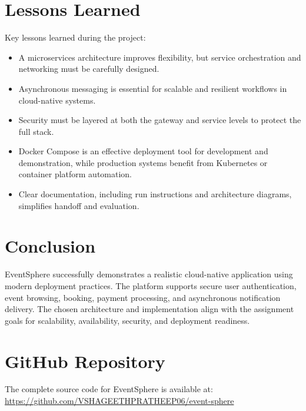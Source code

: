 \documentclass[12pt,a4paper]{article}
\begin{document}
\section{Lessons Learned}
Key lessons learned during the project:
\begin{itemize}[itemsep=0.4em]
    \item A microservices architecture improves flexibility, but service orchestration and networking must be carefully designed.
    \item Asynchronous messaging is essential for scalable and resilient workflows in cloud-native systems.
    \item Security must be layered at both the gateway and service levels to protect the full stack.
    \item Docker Compose is an effective deployment tool for development and demonstration, while production systems benefit from Kubernetes or container platform automation.
    \item Clear documentation, including run instructions and architecture diagrams, simplifies handoff and evaluation.
\end{itemize}

\section{Conclusion}
EventSphere successfully demonstrates a realistic cloud-native application using modern deployment practices. The platform supports secure user authentication, event browsing, booking, payment processing, and asynchronous notification delivery. The chosen architecture and implementation align with the assignment goals for scalability, availability, security, and deployment readiness.

\section{GitHub Repository}
The complete source code for EventSphere is available at: \url{https://github.com/VSHAGEETHPRATHEEP06/event-sphere}
\end{document}
